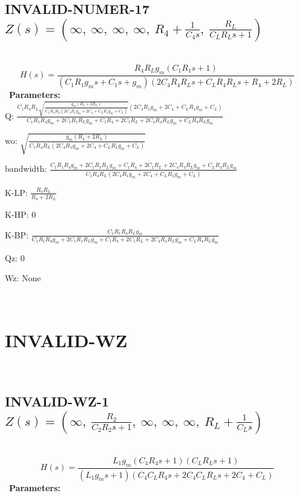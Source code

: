 \documentclass{article}
\begin{document}
\subsection{INVALID-NUMER-17 $Z(s) = \left( \infty, \  \infty, \  \infty, \  \infty, \  R_{4} + \frac{1}{C_{4} s}, \  \frac{R_{L}}{C_{L} R_{L} s + 1}\right)$ } \ 
\textbf{\[H(s) = \frac{R_{4} R_{L} g_{m} \left(C_{1} R_{1} s + 1\right)}{\left(C_{1} R_{1} g_{m} s + C_{1} s + g_{m}\right) \left(2 C_{4} R_{4} R_{L} s + C_{L} R_{4} R_{L} s + R_{4} + 2 R_{L}\right)}\] } \ 
\textbf{Parameters:}\\ 

Q: $\frac{C_{1} R_{4} R_{L} \sqrt{\frac{g_{m} \left(R_{4} + 2 R_{L}\right)}{C_{1} R_{4} R_{L} \left(2 C_{4} R_{1} g_{m} + 2 C_{4} + C_{L} R_{1} g_{m} + C_{L}\right)}} \left(2 C_{4} R_{1} g_{m} + 2 C_{4} + C_{L} R_{1} g_{m} + C_{L}\right)}{C_{1} R_{1} R_{4} g_{m} + 2 C_{1} R_{1} R_{L} g_{m} + C_{1} R_{4} + 2 C_{1} R_{L} + 2 C_{4} R_{4} R_{L} g_{m} + C_{L} R_{4} R_{L} g_{m}}$\ 

wo: $\sqrt{\frac{g_{m} \left(R_{4} + 2 R_{L}\right)}{C_{1} R_{4} R_{L} \left(2 C_{4} R_{1} g_{m} + 2 C_{4} + C_{L} R_{1} g_{m} + C_{L}\right)}}$\ 

bandwidth: $\frac{C_{1} R_{1} R_{4} g_{m} + 2 C_{1} R_{1} R_{L} g_{m} + C_{1} R_{4} + 2 C_{1} R_{L} + 2 C_{4} R_{4} R_{L} g_{m} + C_{L} R_{4} R_{L} g_{m}}{C_{1} R_{4} R_{L} \left(2 C_{4} R_{1} g_{m} + 2 C_{4} + C_{L} R_{1} g_{m} + C_{L}\right)}$\ 

K-LP: $\frac{R_{4} R_{L}}{R_{4} + 2 R_{L}}$\ 

K-HP: $0$\ 

K-BP: $\frac{C_{1} R_{1} R_{4} R_{L} g_{m}}{C_{1} R_{1} R_{4} g_{m} + 2 C_{1} R_{1} R_{L} g_{m} + C_{1} R_{4} + 2 C_{1} R_{L} + 2 C_{4} R_{4} R_{L} g_{m} + C_{L} R_{4} R_{L} g_{m}}$\ 

Qz: $0$\ 

Wz: $\text{None}$\ 

\ 

\section{INVALID-WZ}\ 
\subsection{INVALID-WZ-1 $Z(s) = \left( \infty, \  \frac{R_{2}}{C_{2} R_{2} s + 1}, \  \infty, \  \infty, \  \infty, \  R_{L} + \frac{1}{C_{L} s}\right)$ } \ 
\textbf{\[H(s) = \frac{L_{1} g_{m} \left(C_{4} R_{4} s + 1\right) \left(C_{L} R_{L} s + 1\right)}{\left(L_{1} g_{m} s + 1\right) \left(C_{4} C_{L} R_{4} s + 2 C_{4} C_{L} R_{L} s + 2 C_{4} + C_{L}\right)}\] } \ 
\textbf{Parameters:}\\ 
\end{document}
